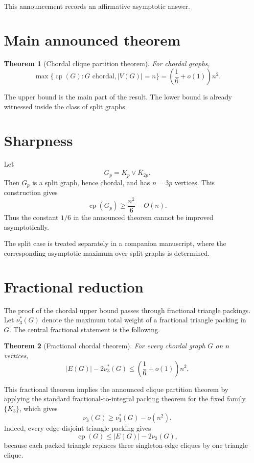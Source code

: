 \documentclass[11pt]{article}
\newtheorem{theorem}{Theorem}
\newcommand{\cp}{\operatorname{cp}}
\begin{document}
This announcement records an affirmative asymptotic answer.

\section{Main announced theorem}

\begin{theorem}[Chordal clique partition theorem]
For chordal graphs,
\[
    \max\{\cp(G):G\text{ chordal}, |V(G)|=n\}
    =
    \left(\frac16+o(1)\right)n^2.
\]
\end{theorem}

The upper bound is the main part of the result. The lower bound is already witnessed inside the class of split graphs.

\section{Sharpness}

Let
\[
    G_p=K_p\vee\overline{K}_{2p}.
\]
Then \(G_p\) is a split graph, hence chordal, and has \(n=3p\) vertices. This construction gives
\[
    \cp(G_p)\ge \frac{n^2}{6}-O(n).
\]
Thus the constant \(1/6\) in the announced theorem cannot be improved asymptotically.

The split case is treated separately in a companion manuscript, where the corresponding asymptotic maximum over split graphs is determined.

\section{Fractional reduction}

The proof of the chordal upper bound passes through fractional triangle packings. Let \(\nu_3^*(G)\) denote the maximum total weight of a fractional triangle packing in \(G\). The central fractional statement is the following.

\begin{theorem}[Fractional chordal theorem]
For every chordal graph \(G\) on \(n\) vertices,
\[
    |E(G)|-2\nu_3^*(G)
    \le
    \left(\frac16+o(1)\right)n^2.
\]
\end{theorem}

This fractional theorem implies the announced clique partition theorem by applying the standard fractional-to-integral packing theorem for the fixed family \(\{K_3\}\), which gives
\[
    \nu_3(G)\ge \nu_3^*(G)-o(n^2).
\]
Indeed, every edge-disjoint triangle packing gives
\[
    \cp(G)\le |E(G)|-2\nu_3(G),
\]
because each packed triangle replaces three singleton-edge cliques by one triangle clique.
\end{document}

